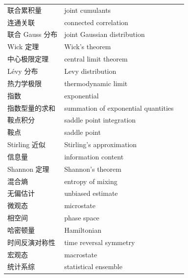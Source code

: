 \begin{xltabular}{\textwidth}{@{}l l c@{}}
  联合累积量 & {\glossaryfont joint cumulants} & \pageref{term:2.joint-cumulants} \\
  连通关联 & {\glossaryfont connected correlation} & \pageref{term:2.conn-corr} \\
  联合 Gauss 分布 & {\glossaryfont joint Gaussian distribution} & \pageref{term:2.joint-gauss} \\
  Wick 定理 & {\glossaryfont Wick's theorem} & \pageref{term:2.wick} \\
  中心极限定理 & {\glossaryfont central limit theorem} & \pageref{term:2.clt} \\
  Lévy 分布 & {\glossaryfont Levy distribution} & \pageref{term:2.levy} \\
  热力学极限 & {\glossaryfont thermodynamic limit} & \pageref{term:2.thermo-limit} \\
  指数 & {\glossaryfont exponential} & \pageref{term:2.exponential} \\
  指数型量的求和 & {\glossaryfont summation of exponential quantities} & \pageref{term:2.sum-exp} \\
  鞍点积分 & {\glossaryfont saddle point integration} & \pageref{term:2.saddle-int} \\
  鞍点 & {\glossaryfont saddle point} & \pageref{term:2.saddle} \\
  Stirling 近似 & {\glossaryfont Stirling's approximation} & \pageref{term:2.stirling} \\
  信息量 & {\glossaryfont information content} & \pageref{term:2.info} \\
  Shannon 定理 & {\glossaryfont Shannon's theorem} & \pageref{term:2.shannon} \\
  混合熵 & {\glossaryfont entropy of mixing} & \pageref{term:2.mix-entropy} \\
  无偏估计 & {\glossaryfont unbiased estimate} & \pageref{term:2.unbiased} \\
  微观态 & {\glossaryfont microstate} & \pageref{term:3.microstate} \\
  相空间 & {\glossaryfont phase space} & \pageref{term:3.phase-space} \\
  哈密顿量 & {\glossaryfont Hamiltonian} & \pageref{term:3.hamiltonian} \\
  时间反演对称性 & {\glossaryfont time reversal symmetry} & \pageref{term:3.time-reversal} \\
  宏观态 & {\glossaryfont macrostate} & \pageref{term:3.macrostate} \\
  统计系综 & {\glossaryfont statistical ensemble} & \pageref{term:3.ensemble} \\

\end{xltabular}
